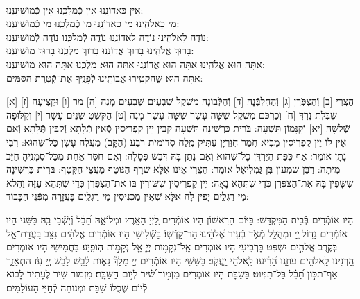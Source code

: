 \documentclass[twoside, openany, parskip=half, 11pt]{book}
\begin{document}
\shabbossimshalom


\tachanunim

\\

\fullkaddish




\label{einkelokeinu}
 \hfill אֵין כַּאדוֹנֵֽנוּ \hfill אֵין כְּֿמַלְכֵּֽנוּ \hfill אֵין כְּֿמוֹשִׁיעֵֽנוּ:\\
מִי כֵאלֹהֵֽינוּ \hfill מִי כַאדוֹנֵֽנוּ \hfill מִי כְֿמַלְכֵּֽנוּ \hfill מִי כְֿמוֹשִׁיעֵֽנוּ:\\
נוֹדֶה לֵאלֹהֵֽינוּ \hfill נוֹדֶה לַאדוֹנֵֽנוּ \hfill נוֹדֶה לְֿמַלְכֵּֽנוּ \hfill נוֹדֶה לְֿמוֹשִׁיעֵֽנוּ:\\
בָּרוּךְ אֱלֹהֵֽינוּ \hfill בָּרוּךְ אֲדוֹנֵֽנוּ \hfill בָּרוּךְ מַלְכֵּֽנוּ \hfill בָּרוּךְ מוֹשִׁיעֵֽנוּ:\\
אַתָּה הוּא אֱלֹהֵֽינוּ אַתָּה הוּא אֲדוֹנֵֽנוּ אַתָּה הוּא מַלְכֵּֽנוּ אַתָּה הוּא מוֹשִׁיעֵֽנוּ:\\
 אַתָּה הוּא שֶׁהִקְטִֽירוּ אֲבוֹתֵֽינוּ לְֿפָנֶֽיךָ אֶת־קְֿטֹֽרֶת הַסַּמִּים:

\nextpage

 [א] הַצֳּרִי [ב] וְֿהַצִּפֹּֽרֶן [ג] וְֿהַחֶלְבְּֿנָה [ד] וְֿהַלְּֿבוֹנָה מִשְׁקַל שִׁבְעִים שִׁבְעִים מָנֶה [ה] מֹר [ו] וּקְצִיעָה [ז] שִׁבֹּֽלֶת נֵרְֿדְּ [ח] וְֿכַרְכֹּם מִשְׁקַל שִׁשָּׁה עָשָׂר שִׁשָּׁה עָשָׂר מָנֶה [ט] הַקֹּשְֿׁטְ שְֿׁנֵים עָשָׂר [י] וְֿקִלּוּפָה שְֿׁלֹשָׁה [יא] וְֿקִנָּמוֹן תִּשְׁעָה: בֹּרִית כַּרְשִׁינָה תִּשְׁעָה קַבִּין יֵין קַפְרִיסִין סְֿאִין תְּֿלָתָא וְֿקַבִּין תְּֿלָתָא וְֿאִם אֵין לוֹ יֵין קַפְרִיסִין מֵבִיא חֲמַר חִוַּרְיָן עַתִּיק מֶֽלַח סְֿדוֹמִית רֹבַע (הַקָּב) מַעֲלֶה עָשָׁן כׇּל־שֶׁהוּא: רְֿבִי נָתָן אוֹמֵר: אַף כִּפַּת הַיַּרְדֵּן כׇּל־שֶׁהוּא וְֿאִם נָתַן בָּהּ דְּֿבַשׁ פְּֿסָלָהּ: וְֿאִם חִסַּר אַחַת מִכׇּל־סַמָּנֶֽיהָ חַיַּב מִיתָה: רַבָּן שִׁמְעוֹן בֶּן גַּמְלִיאֵל אוֹמֵר: הַצֳּרִי אֵינוֹ אֶלָּא שְֿׂרָף הַנּוֹטֵף מֵעֲצֵי הַקְּֿטָף: בֹּרִית כַּרְשִׁינָה שֶׁשָּׁפִין בָּהּ אֶת־הַצִּפֹּֽרֶן כְּֿדֵי שֶׁתְּֿהֵא נָאָה: יֵין קַפְרִיסִין שֶׁשּׁוֹרִין בּוֹ אֶת־הַצִּפֹּֽרֶן כְּֿדֵי שֶׁתְּֿהֵא עַזָּה וַהֲלֹא מֵי רַגְלַֽיִם יָפִין לָהּ אֶלָּא שֶׁאֵין מַכְנִיסִין מֵי רַגְלַֽיִם בָּעֲזָרָה מִפְּֿנֵי הַכָּבוֹד:

\vspace{-.3\baselineskip}
 הָיוּ אוֹמְֿרִים בְּֿבֵית הַמִּקְדָּשׁ:
 בַּיּוֹם הַרִאשׁוֹן הָיוּ אוֹמְֿרִים לַ֭יְיָ הָאָ֣רֶץ וּמְלוֹאָ֑הּ תֵּ֝בֵ֗ל וְֿי֣שְֿׁבֵי בָֽהּ׃
בַּשֵּׁנִי הָיוּ אוֹמְֿרִים גָּד֣וֹל ֖יְיָ֣ וּמְהֻלָּ֣ל מְֿאֹ֑ד בְּֿעִ֥יר אֱ֝לֹהֵ֗ינוּ הַר־קָדְֿשֽׁוֹ׃
בַּשְּֿׁלִישִׁי הָיוּ אוֹמְֿרִים אֱלֹהִ֗ים נִצָּ֥ב בַּֽעֲדַת־אֵ֑ל בְּֿקֶ֖רֶב אֱלֹהִ֣ים יִשְׁפֹּֽט׃ בָּרְֿבִיעִי הָיוּ אוֹמְֿרִים אֵֽל־נְֿֿקָמ֥וֹת יְיָ֑ אֵ֖ל נְֿקָמ֣וֹת הֽוֹפִֽיַע׃ בַּחֲמִישִׁי הָיוּ אוֹמְֿרִים הַ֭רְנִינוּ לֵֽאלֹהִ֣ים עוּזֵּ֑נוּ הָ֝רִ֗יעוּ לֵֽאלֹהֵ֥י יַֽעֲקֹֽב׃ בַּשִּׁשִּׁי הָיוּ אוֹמְֿרִים יְיָ֣ מָלָךְ֘ גֵּא֢וּת לָ֫בֵ֥שׁ לָבֵ֣שׁ יְ֖יָ עֹ֥ז הִתְאַזָּ֑ר אַף־תִּכּ֣וֹן תֵּ֝בֵ֗ל בַּל־תִּמּֽוֹט׃ בַּשַׁבָּת הָיוּ אוֹמְֿרִים מִזְמ֥וֹר שִׁ֝֗יר לְֿי֥וֹם הַשַּׁבָּֽת׃ מִזְמוֹר שִׁיר לֶעָתִיד לָבוֹא לְֿיוֹם שֶׁכֻּלּוֹ שַׁבָּת וּמְנוּחָה לְֿחַיֵּי הָעוֹלָמִים׃
\end{document}
